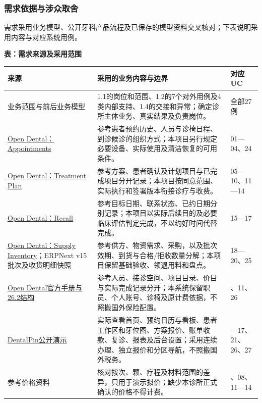 \documentclass[UTF8,a4paper,zihao=-4,fontset=none]{ctexart}
\begin{document}
\subsubsection{需求依据与涉众取舍}
\label{sec:requirement-basis}
\begingroup\small\linespread{1.04}\selectfont
需求采用业务模型、公开牙科产品流程及已保存的模型资料交叉核对；下表说明采用内容与对应系统用例。\par\smallskip
{\setlength{\tabcolsep}{3pt}\renewcommand{\arraystretch}{1.08}
\noindent\textbf{表\thetable：需求来源及采用范围}\par\smallskip
\noindent\begin{tabular}{@{}>{\raggedright\arraybackslash}p{3.5cm}>{\raggedright\arraybackslash}p{9.8cm}>{\raggedright\arraybackslash}p{2.4cm}@{}}
\toprule
来源 & 采用的业务内容与边界 & 对应UC \\ \midrule
业务范围与前后业务模型 & 1.1的岗位和范围、1.2的7个对外用例及4类内部支持、1.4的交接和异常；确定诊所主体业务、真实结果及负责岗位。 & 全部27例 \\
\href{https://www.opendental.com/manual/appointments.html}{Open Dental：Appointments} & 参考患者预约历史、人员与诊椅日程、到诊候诊的组织方式；本项目另行规定必要设备、实际使用及清洁恢复的可用条件。 & \mbox{01—04}、24 \\
\href{https://www.opendental.com/manual/treatmentplan.html}{Open Dental：Treatment Plan} & 参考方案、患者确认及计划项目与已完成项目分开记录；本项目按同意范围、实际执行和签署版本衔接诊疗与收费。 & \mbox{05—10}、\mbox{11—14} \\
\href{https://www.opendental.com/manual/recall.html}{Open Dental：Recall} & 参考目标日期、联系状态、已约日期分别记录；本项目以实际后续目的及必要临床评估判定完成，不以约好时间代替完成。 & \mbox{15—17} \\
\href{https://www.opendental.com/manual/supplyinventory.html}{Open Dental：Supply Inventory}；ERPNext v15批次及收货明细快照 & 参考供方、物资需求、采购，以及批次效期、到货与合格/拒收数量分解；本项目保留基础验收、领退用料和盘点。 & \mbox{18—20}、25 \\
\href{https://www.opendental.com/site/quickmanual.html}{Open Dental官方手册与26.2结构} & 参考人员、接诊空间、项目目录、价目与实际完成记录分开；本系统保留职员、个人账号、诊椅及原计费依据，不照搬国外保险配置。 & 04、11、26 \\
\href{https://demo.dentalpin.com/}{DentalPin公开演示} & 实际查看首页、预约日历与看板、患者工作区和牙位图、方案报价、账单收款、复诊、报表及后台设置；采用连续办理、独立报价和分区导航，不照搬国外税务。 & 01—17、21、26、27 \\
参考价格资料 & 核对按次、颗、疗程及材料范围的差异，只用于演示拟价；缺少本诊所正式确认的价格不得计费。 & 07、08、11—14 \\
\bottomrule
\end{tabular}\par}
\end{document}
